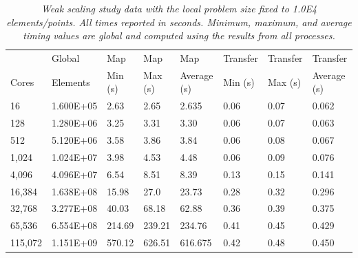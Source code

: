 \documentclass{mc2013}
\begin{document}
\begin{table}[htpb!]
  \begin{center}
    \begin{tabular}{llllllll}\hline\hline
      \multicolumn{1}{l}{} & \multicolumn{1}{l}{Global} &
      \multicolumn{1}{l}{Map} & \multicolumn{1}{l}{Map} &
      \multicolumn{1}{l}{Map} & \multicolumn{1}{l}{Transfer} &
      \multicolumn{1}{l}{Transfer} &
      \multicolumn{1}{l}{Transfer}\\ \multicolumn{1}{l}{Cores} &
      \multicolumn{1}{l}{Elements} & \multicolumn{1}{l}{Min (s)} &
      \multicolumn{1}{l}{Max (s)} & \multicolumn{1}{l}{Average (s)} &
      \multicolumn{1}{l}{Min (s)} & \multicolumn{1}{l}{Max (s)} &
      \multicolumn{1}{l}{Average (s)}\\ \hline\hline %
      16 & 1.600E+05
      & 2.63 & 2.65 & 2.635 & 0.06 & 0.07 & 0.062 \\ 128 & 1.280E+06 &
      3.25 & 3.31 & 3.30 & 0.06 & 0.07 & 0.063 \\ 512 & 5.120E+06 &
      3.58 & 3.86 & 3.84 & 0.06 & 0.08 & 0.067 \\ 1,024 & 1.024E+07 &
      3.98 & 4.53 & 4.48 & 0.06 & 0.09 & 0.076 \\ 4,096 & 4.096E+07 &
      6.54 & 8.51 & 8.39 & 0.13 & 0.15 & 0.141 \\ 16,384 & 1.638E+08 &
      15.98 & 27.0 & 23.73 & 0.28 & 0.32 & 0.296 \\ 32,768 & 3.277E+08
      & 40.03 & 68.18 & 62.88 & 0.36 & 0.39 & 0.375 \\ 65,536 &
      6.554E+08 & 214.69 & 239.21 & 234.76 & 0.41 & 0.45 & 0.429
      \\ 115,072 & 1.151E+09 & 570.12 & 626.51 & 616.675 & 0.42 & 0.48
      & 0.450 \\ \hline\hline
    \end{tabular}
  \end{center}
  \caption{\sl Weak scaling study data with the local problem size
    fixed to 1.0E4 elements/points. All times reported in
    seconds. Minimum, maximum, and average timing values are global
    and computed using the results from all processes.}
  \label{tab:weak_scaling}
\end{table}
\end{document}
